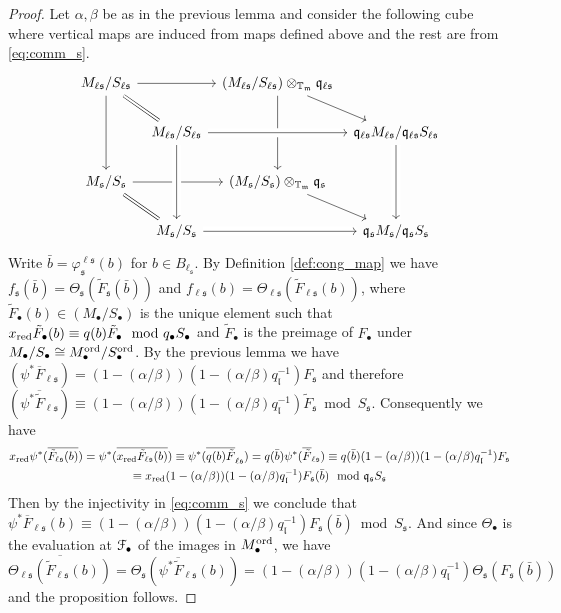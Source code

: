 \documentclass[leqno]{amsart}
\theoremstyle{definition}
\theoremstyle{remark}
\newcommand{\fl}{\mathfrak{l}}
\newcommand{\fm}{\mathfrak{m}}
\newcommand{\fq}{\mathfrak{q}}
\newcommand{\fs}{\mathfrak{s}}
\newcommand{\xx}{x_\textnormal{red}}
\newcommand{\TT}{\mathbb{T}} %
\newcommand{\euF}{\EuScript{F}} %
\newcommand{\ord}{\textnormal{ord}} %
\begin{document}
\begin{proof}

Let $\alpha,\beta$ be as in the previous lemma 
and consider the following cube
where vertical maps are induced from 
maps defined above
and the rest are from \eqref{eq:comm_s}.
\begin{equation*}
\begin{tikzcd}[column sep=tiny]
M_{\ell\fs}/S_{\ell\fs}\arrow{dd} \arrow[rd,equal]\arrow[rr]
&& (M_{\ell\fs}/S_{\ell\fs})\otimes_{\TT_\fm}\fq_{\ell\fs}
	\arrow[rd]\arrow[dd]\\
& M_{\ell\fs}/S_{\ell\fs}
	\arrow[crossing over]{dd} \arrow[crossing over]{rr} 
&& \fq_{\ell\fs}M_{\ell\fs}/\fq_{\ell\fs}S_{\ell\fs}
	\arrow[crossing over]{dd}\\
M_{\fs}/S_{\fs}\arrow{rr}\arrow[rd,equal]
&& (M_{\fs}/S_{\fs})\otimes_{\TT_\fm} \fq_{\fs}
	\arrow[rd]\\
& M_{\fs}/S_{\fs} \arrow[crossing over]{rr} 
&& \fq_{\fs}M_{\fs}/\fq_{\fs}S_{\fs}
\arrow[from=2-2,to=4-2,crossing over]
\arrow[from=2-4,to=4-4,crossing over]
\end{tikzcd}
\end{equation*}
Write $\bar{b}=\varphi^{\ell\fs}_{\fs}(b)$
for $b\in B_{\ell_\fs}$.
By Definition \ref{def:cong_map} we have
$f_\fs(\bar{b})=\Theta_{\fs}(\tilde{F}_\fs(\bar{b}))$ and 
$f_{\ell\fs}(b)=\Theta_{\ell\fs}(\tilde{F}_{\ell\fs}(b))$,
where $\tilde{F}_\bullet(b)\in (M_\bullet/S_\bullet)$
is the unique element such that 
$\xx \tilde{F}_\bullet(b)\equiv 
q(b)\tilde{F}_\bullet\mod q_\bullet S_\bullet$
and $\tilde{F}_\bullet$ is the preimage 
of $F_\bullet$ under 
$M_\bullet/S_\bullet\cong M_\bullet^{\ord}/S_\bullet^{\ord}$.
By the previous lemma we have
$(\psi^*\overline{F}_{\ell\fs})=
(1-(\alpha/\beta))(1-(\alpha/\beta)q_\fl^{-1})F_{\fs}$
and therefore
$(\psi^*\overline{\tilde{F}}_{\ell\fs})\equiv
(1-(\alpha/\beta))(1-(\alpha/\beta)q_\fl^{-1})\tilde{F}_{\fs}
\bmod S_\fs$. Consequently we have
\begin{multline*}
\xx\psi^*(\overline{\tilde{F}_{\ell\fs}(b)})=
\psi^*(\overline{\xx \tilde{F}_{\ell\fs}(b)})\equiv 
\psi^*(\overline{q(b)\tilde{F}}_{\ell\fs})=
q(\bar{b})\psi^*(\overline{\tilde{F}}_{\ell\fs}) \equiv 
q(\bar{b})(1-(\alpha/\beta))(1-(\alpha/\beta)q_\fl^{-1})
F_{\fs}\\\equiv
\xx(1-(\alpha/\beta))(1-(\alpha/\beta)q_\fl^{-1})
F_{\fs}(\bar{b})\mod \fq_\fs S_\fs
\end{multline*}
Then by the injectivity in \eqref{eq:comm_s} we conclude that
$\psi^*\overline{F}_{\ell\fs}(b)\equiv
(1-(\alpha/\beta))(1-(\alpha/\beta)q_\fl^{-1})
F_\fs(\bar{b})\bmod S_\fs$.
And since $\Theta_\bullet$ is the evaluation
at $\euF_\bullet$ of the images in $M_\bullet^{\ord}$,
we have
\[
    \overline{\Theta_{\ell\fs}(\tilde{F}_{\ell\fs}(b))}
    =\Theta_\fs(\psi^*\overline{\tilde{F}}_{\ell\fs}(b))=
    (1-(\alpha/\beta))(1-(\alpha/\beta)q_\fl^{-1})
    \Theta_\fs(F_\fs(\bar{b}))
\]
and the proposition follows.
	
\end{proof}
\end{document}
